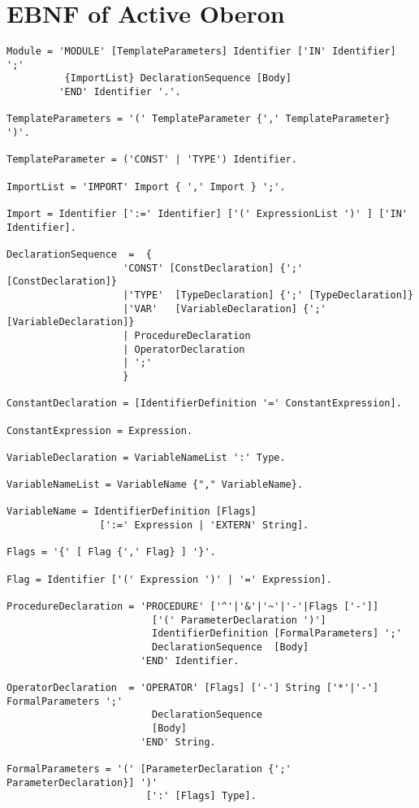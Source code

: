 \documentclass[a4wide,11pt]{article}
\begin{document}
\section{EBNF of Active Oberon}
\label{section:FullEbnf}
\scriptsize
\begin{lstlisting}[style=EBNF]
Module = 'MODULE' [TemplateParameters] Identifier ['IN' Identifier]  ';'
          {ImportList} DeclarationSequence [Body]
         'END' Identifier '.'.

TemplateParameters = '(' TemplateParameter {',' TemplateParameter} ')'.

TemplateParameter = ('CONST' | 'TYPE') Identifier.

ImportList = 'IMPORT' Import { ',' Import } ';'.

Import = Identifier [':=' Identifier] ['(' ExpressionList ')' ] ['IN' Identifier].

DeclarationSequence  =  {
					'CONST' [ConstDeclaration] {';' [ConstDeclaration]}
					|'TYPE'  [TypeDeclaration] {';' [TypeDeclaration]}
					|'VAR'   [VariableDeclaration] {';' [VariableDeclaration]}
					| ProcedureDeclaration
					| OperatorDeclaration
					| ';'
					}

ConstantDeclaration = [IdentifierDefinition '=' ConstantExpression].

ConstantExpression = Expression.

VariableDeclaration = VariableNameList ':' Type.

VariableNameList = VariableName {"," VariableName}.

VariableName = IdentifierDefinition [Flags]
                [':=' Expression | 'EXTERN' String].

Flags = '{' [ Flag {',' Flag} ] '}'.

Flag = Identifier ['(' Expression ')' | '=' Expression].

ProcedureDeclaration = 'PROCEDURE' ['^'|'&'|'~'|'-'|Flags ['-']]
                         ['(' ParameterDeclaration ')']
                         IdentifierDefinition [FormalParameters] ';'
                         DeclarationSequence  [Body]
                       'END' Identifier.

OperatorDeclaration  = 'OPERATOR' [Flags] ['-'] String ['*'|'-'] FormalParameters ';'
                         DeclarationSequence
                         [Body]
                       'END' String.

FormalParameters = '(' [ParameterDeclaration {';' ParameterDeclaration}] ')'
                        [':' [Flags] Type].


\end{lstlisting}
\end{document}
